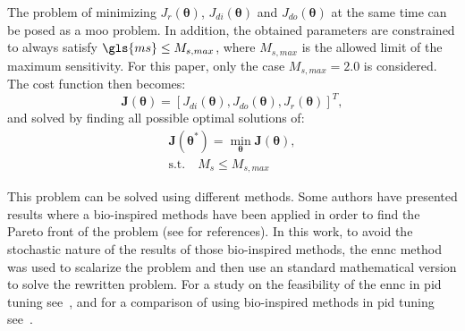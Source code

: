 \begin{refsection}
The problem of minimizing $J_r(\bm{\theta})$, $J_{di}(\bm{\theta})$ and $J_{do}(\bm{\theta})$ at the same time can be posed as a \gls{moo} problem. In addition, the obtained parameters are constrained to always satisfy  $\gls{ms} \leq M_{s,max}$, where $M_{s,max}$ is the allowed limit of the maximum sensitivity. For this paper, only the case $M_{s,max} = 2.0$ is considered. The cost function then becomes:
%
\begin{equation}  %
\textbf{J}(\bm{\theta})=\left[J_{di}(\bm{\theta}), J_{do}(\bm{\theta}), J_{r}(\bm{\theta})\right]^T,
\label{J}
\end{equation}
%
and solved by finding all possible optimal solutions of:
%
\begin{equation}  %
\begin{gathered}
\textbf{J}(\bm{\theta}^*) = \min_{\bm{\theta}} \textbf{J}(\bm{\theta}),\\
\text{s.t.} \quad  M_s \leq M_{s,max}
\end{gathered}
\label{probmoo}
\end{equation}

This problem can be solved using different methods. Some authors have presented results where a bio-inspired methods have been applied in order to find the Pareto front of the problem (see for \cite{Sayed2012, Reynoso-Meza2012, Reynoso-Meza2012b, Chiha2012} references). In this work, to avoid the stochastic nature of the results of those bio-inspired methods, the \gls{ennc} method was used to scalarize the problem and then use an standard mathematical version to solve the rewritten problem. For a study on the feasibility of the \gls{ennc} in \gls{pid} tuning see~\textcite{Contreras-Leiva2016}, and for a comparison of using bio-inspired methods in \gls{pid} tuning see~\textcite{Cespedes2016}.
\printbibliography
\end{refsection}